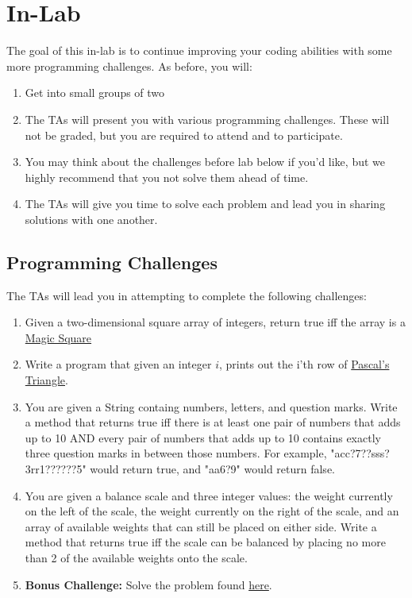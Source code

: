 \documentclass[paper=a4, fontsize=11pt, parskip=full]{scrartcl} %
\numberwithin{equation}{section} %
\numberwithin{figure}{section} %
\numberwithin{table}{section} %
\begin{document}
\section{In-Lab}

The goal of this in-lab is to continue improving your coding abilities with some more programming challenges. As before, you will:

\begin{enumerate}
	\item Get into small groups of two
	\item The TAs will present you with various programming challenges. These will not be graded, but you are required to attend and to participate.
	\item You may think about the challenges before lab below if you'd like, but we highly recommend that you not solve them ahead of time.
	\item The TAs will give you time to solve each problem and lead you in sharing solutions with one another.
\end{enumerate}

\subsection{Programming Challenges}

The TAs will lead you in attempting to complete the following challenges:

\begin{enumerate}
	\item Given a two-dimensional square array of integers, return true iff the array is a \href{https://en.wikipedia.org/wiki/Magic_square}{Magic Square}
	\item Write a program that given an integer $i$, prints out the i'th row of \href{https://en.wikipedia.org/wiki/Pascal%27s_triangle}{Pascal's Triangle}.
	\item You are given a String containg numbers, letters, and question marks. Write a method that returns true iff there is at least one pair of numbers that adds up to 10 AND every pair of numbers that adds up to 10 contains exactly three question marks in between those numbers. For example, "acc?7??sss?3rr1??????5" would return true, and "aa6?9" would return false.
	\item You are given a balance scale and three integer values: the weight currently on the left of the scale, the weight currently on the right of the scale, and an array of available weights that can still be placed on either side. Write a method that returns true iff the scale can be balanced by placing no more than 2 of the available weights onto the scale.
	\item \textbf{Bonus Challenge:} Solve the problem found \href{https://projecteuler.net/problem=14}{here}.
\end{enumerate}
\end{document}
